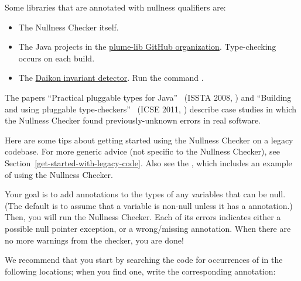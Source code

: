 Some libraries that are annotated with nullness qualifiers are:

\begin{itemize}
\item
The Nullness Checker itself.

\item
The Java projects in the \href{https://github.com/plume-lib/}
{plume-lib GitHub organization}.
Type-checking occurs on each build.

\item
The
\href{http://plse.cs.washington.edu/daikon/}{Daikon invariant detector}.
Run the command .

\end{itemize}



The papers ``Practical pluggable types for Java''~\cite{PapiACPE2008}
(ISSTA 2008,
)
and ``Building and using pluggable type-checkers''~\cite{DietlDEMS2011}
(ICSE 2011,
)
describe case studies in which the Nullness Checker found
previously-unknown errors in real software.



Here are some tips about getting started using the Nullness Checker on a
legacy codebase.  For more generic advice (not specific to the Nullness
Checker), see Section~\ref{get-started-with-legacy-code}.  Also see the
, which includes an example of using the Nullness Checker.

Your goal is to add  annotations
to the types of any variables that can be null.  (The default is to assume
that a variable is non-null unless it has a  annotation.)
Then, you will run the Nullness Checker.  Each of its errors indicates
either a possible null pointer exception, or a wrong/missing annotation.
When there are no more warnings from the checker, you are done!

We recommend that you start by searching the code for occurrences of
 in the following locations; when you find one, write the
corresponding annotation:

